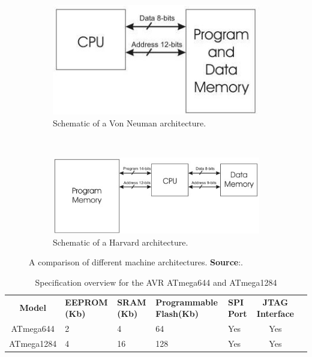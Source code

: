 \documentclass[10pt,a4paper,twocolumn]{article}
\begin{document}
\begin{figure}
	\begin{subfigure}{0.5\textwidth}
		\center
		\includegraphics[scale=0.5]{img/von_neuman_arch.jpg}
		\caption{Schematic of a Von Neuman architecture.}
		\label{fig:VN_arch}
	\end{subfigure} 
	~
	\begin{subfigure}{0.5\textwidth}
		\center
		\includegraphics[scale=0.5]{img/harvard_arch.jpeg}
		\caption{Schematic of a Harvard architecture.}
		\label{fig:H_arch}
	\end{subfigure}
	\caption{A comparison of different machine architectures. \textbf{Source}:\protect\citep{website:mcu_primer}.}
	\label{fig:architectures}
\end{figure}	
		
	\begin{table}
		\begin{tabular}{| c | p{2cm} | p{1.5cm} | p{3cm} | p{2.8cm} | c | p{1.9cm} |}
		\textbf{Model} & \textbf{EEPROM (Kb)} & \textbf{SRAM (Kb)} & \textbf{Programmable Flash(Kb)} & \textbf{SPI Port} & \textbf{JTAG Interface}\\
		ATmega644 & 2 & 4 & 64 & Yes & Yes\\
		ATmega1284 & 4 & 16 & 128 & Yes & Yes \\
		
		
		\end{tabular}
	\caption{Specification overview for the AVR ATmega644 and ATmega1284}
	\label{table:avr_specs}
	\end{table}
	
\end{document}
